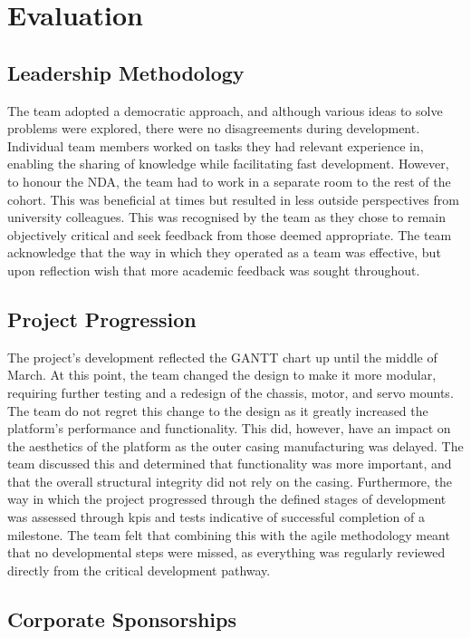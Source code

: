 \documentclass [12pt]{article}
\begin{document}
\newpage
\section{Evaluation}

\subsection{Leadership Methodology}
The team adopted a democratic approach, and although various ideas to solve problems were explored, there were no disagreements during development. Individual team members worked on tasks they had relevant experience in, enabling the sharing of knowledge while facilitating fast development. However, to honour the NDA, the team had to work in a separate room to the rest of the cohort. This was beneficial at times but resulted in less outside perspectives from university colleagues. This was recognised by the team as they chose to remain objectively critical and seek feedback from those deemed appropriate. The team acknowledge that the way in which they operated as a team was effective, but upon reflection wish that more academic feedback was sought throughout.

\subsection{Project Progression}
The project’s development reflected the GANTT chart up until the middle of March. At this point, the team changed the design to make it more modular, requiring further testing and a redesign of the chassis, motor, and servo mounts. The team do not regret this change to the design as it greatly increased the platform’s performance and functionality. This did, however, have an impact on the aesthetics of the platform as the outer casing manufacturing was delayed.  The team discussed this and determined that functionality was more important, and that the overall structural integrity did not rely on the casing. Furthermore, the way in which the project progressed through the defined stages of development was assessed through \gls{kpi}s and tests indicative of successful completion of a milestone. The team felt that combining this with the agile methodology meant that no developmental steps were missed, as everything was regularly reviewed directly from the critical development pathway.

\subsection{Corporate Sponsorships}
\end{document}
